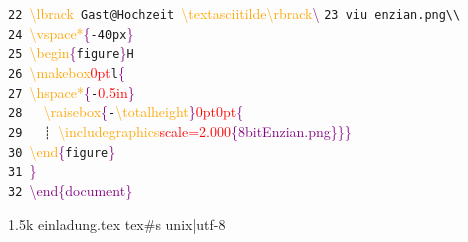 \documentclass[12pt, a5paper]{article}
\newcommand{\red}[1]{\textcolor{red}{#1}}
\newcommand{\orange}[1]{\textcolor{orange}{#1}}
\newcommand{\purple}[1]{\textcolor{purple}{#1}}
\begin{document}
{ \verb!22 !\orange{\textbackslash lbrack}\verb! Gast@Hochzeit !\orange{\textbackslash textasciitilde\textbackslash rbrack}\purple{\textbackslash\textdollar}
 \verb!23 viu enzian.png\\!\\
 \verb!24 !\orange{\textbackslash vspace*}\purple{\{}\verb!-40px!\purple{\}}\\
 \verb!25 !\orange{\textbackslash begin}\purple{\{}\verb!figure!\purple{\}\lbrack}\verb!H!\purple{\rbrack}\\
 \verb!26 !\orange{\textbackslash makebox}\purple{\lbrack}\red{0pt}\purple{\rbrack\lbrack}\verb!l!\purple{\rbrack\{}\\
 \verb!27 !\orange{\textbackslash hspace*}\purple{\{}\verb!-!\red{0.5in}\purple{\}}\\
 \verb!28   !\orange{\textbackslash raisebox}\purple{\{}\verb!-!\orange{\textbackslash totalheight}\purple{\}\lbrack}\red{0pt}\purple{\rbrack\lbrack}\red{0pt}\purple{\rbrack\{}\\
 \verb!29   ┊ !\orange{\textbackslash includegraphics}\purple{\lbrack}\red{scale=2.000}\purple{\rbrack\{8bitEnzian.png\}\}\}}\\
 \verb!30 !\orange{\textbackslash end}\purple{\{}\verb!figure!\purple{\}}\\
 \verb!31 !\purple{\}}\\
 \verb!32 !\purple{\textbackslash end\{document\}}\\
 \mbox{}
\vfill
\begin{tcolorbox}
\newcommand{\grey}{\color{grey}}
1.5k einladung.tex tex\#s unix|utf-8
\end{tcolorbox}

}
\end{document}
